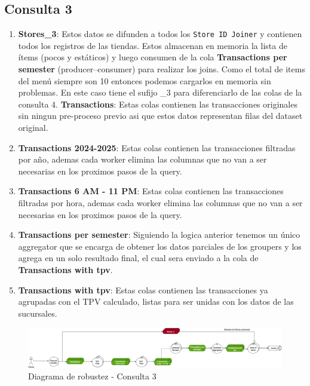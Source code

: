 \documentclass[titlepage,a4paper]{article}
\begin{document}
\subsection*{Consulta 3}
\begin{enumerate}
    \item \textbf{Stores\_3}: Estos datos se difunden a todos los \texttt{Store ID Joiner} y contienen todos los registros de las tiendas. Estos almacenan en memoria la lista de ítems (pocos y estáticos) y luego consumen de la cola \textbf{Transactions per semester} (producer--consumer) para realizar los joins. Como el total de items del menú siempre son 10 entonces podemos cargarlos en memoria sin problemas. En este caso tiene el sufijo \_3 para diferenciarlo de las colas de la consulta 4.\newline
    \textbf{Transactions}: Estas colas contienen las transacciones originales sin ningun pre-proceso previo asi que estos datos representan filas del dataset original.
    \item \textbf{Transactions 2024-2025}: Estas colas contienen las transacciones filtradas por año, ademas cada worker elimina las columnas que no van a ser necesarias en los proximos pasos de la query.
    \item \textbf{Transactions 6 AM - 11 PM}: Estas colas contienen las transacciones filtradas por hora, ademas cada worker elimina las columnas que no van a ser necesarias en los proximos pasos de la query.
    \item \textbf{Transactions per semester}: Siguiendo la logica anterior tenemos un único aggregator que se encarga de obtener los datos parciales de los groupers y los agrega en un solo resultado final, el cual sera enviado a la cola de \textbf{Transactions with tpv}.
    \item \textbf{Transactions with tpv}: Estas colas contienen las transacciones ya agrupadas con el TPV calculado, listas para ser unidas con los datos de las sucursales.
\end{enumerate}

\begin{figure}[H]
    \centering
    \includegraphics[width=1.0\textwidth]{consulta3.png}
    \caption{Diagrama de robustez - Consulta 3}
\end{figure}
\end{document}
